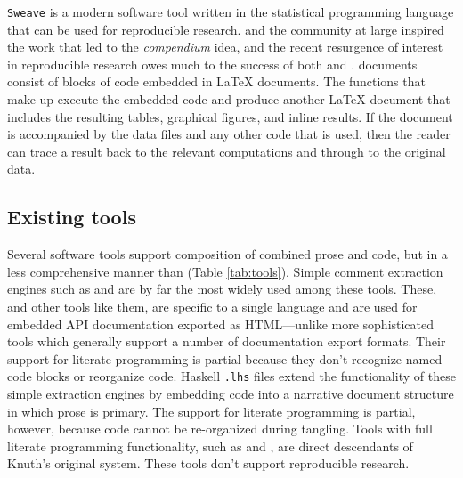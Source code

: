 \documentclass[article,shortnames]{jss}
\begin{document}
\texttt{Sweave} \citep{sweave} is a modern software tool written in the 
statistical programming language \citep{r-software} that can be used
for reproducible research.   and the  community at large
inspired the work that led to the \emph{compendium} idea, and the recent
resurgence of interest in reproducible research owes much to the
success of both  and .   documents consist of blocks of 
code embedded in \LaTeX{} documents.  The  functions that make up 
execute the embedded  code and produce another \LaTeX{} document that
includes the resulting tables, graphical figures, and inline results.
If the  document is accompanied by the data files and any other
code that is used, then the reader can trace a result back to the
relevant computations and through to the original data.
\subsection{Existing tools}
\label{sec-2-3}

Several software tools support composition of combined prose and code,
but in a less comprehensive manner than  (Table
\ref{tab:tools}).  Simple comment extraction engines such as  and
 are by far the most widely used among these tools.  These, and
other tools like them, are specific to a single language and are used
for embedded API documentation exported as HTML---unlike more
sophisticated tools which generally support a number of documentation
export formats. Their support for literate
programming is partial because they don't recognize named code blocks
or reorganize code.  Haskell \texttt{.lhs} files extend the functionality of
these simple extraction engines by embedding code into a narrative
document structure in which prose is primary.  The support for
literate programming is partial, however, because code cannot be
re-organized during tangling.  Tools with full literate programming
functionality, such as  and , are direct descendants of
Knuth's original  system.  These tools don't support reproducible
research.
\end{document}
